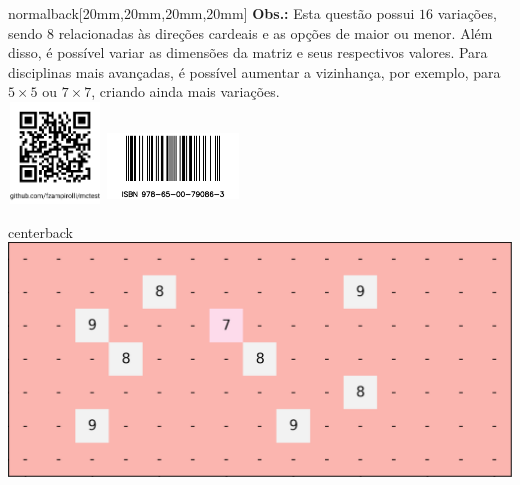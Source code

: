\documentclass[
    coverwidth=21cm,  %
    coverheight=29.7cm, %
    spinewidth=12mm,  %
    flapwidth=8cm,    %
    wrapwidth=0mm,    %
    ]{bookcover}
\begin{document}
\begin{bookcover}
\begin{bookcoverelement}{normal}{back}[20mm,20mm,20mm,20mm]
\textbf{Obs.:} Esta questão possui $16$ variações, sendo $8$ relacionadas às direções cardeais e as opções de maior ou menor. Além disso, é possível variar as dimensões da matriz e seus respectivos valores. Para disciplinas mais avançadas, é possível aumentar a vizinhança, por exemplo, para $5\times 5$ ou $7\times 7$, criando ainda mais variações.\\[8mm]

    {\centering 
    \includegraphics[height=27mm,width=25mm]{./figures/qrcode.png}\hfill
    \includegraphics[height=20mm,width=35mm]{./figures/barcode-impresso.png}
    }
\end{bookcoverelement}

\begin{bookcoverelement}{center}{back}
    \includegraphics[width=.2\textwidth]{./figures/verso.png}
\end{bookcoverelement}

\end{bookcover}
\end{document}
